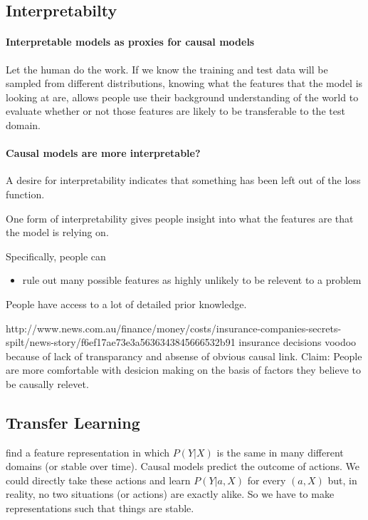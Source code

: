 \documentclass[11pt,a4paper,oneside]{book}
\begin{document}
\subsection*{Interpretabilty}
\paragraph*{Interpretable models as proxies for causal models} Let the human do the work. If we know the training and test data will be sampled from different distributions, knowing what the features that the model is looking at are, allows people use their background understanding of the world to evaluate whether or not those features are likely to be transferable to the test domain. 

\paragraph*{Causal models are more interpretable?}

A desire for interpretability indicates that something has been left out of the loss function. 

One form of interpretability gives people insight into what the features are that the model is relying on.

Specifically, people can
\begin{itemize}
\item rule out many possible features as highly unlikely to be relevent to a problem
\end{itemize}

People have access to a lot of detailed prior knowledge.  

http://www.news.com.au/finance/money/costs/insurance-companies-secrets-spilt/news-story/f6ef17ae73e3a5636343845666532b91 insurance decisions voodoo because of lack of transparancy and absense of obvious causal link. Claim: People are more comfortable with desicion making on the basis of factors they believe to be causally relevet.

\subsection*{Transfer Learning}
find a feature representation in which $P(Y|X)$ is the same in many different domains (or stable over time). Causal models predict the outcome of actions. We could directly take these actions and learn $P(Y|a,X)$ for every $(a,X)$ but, in reality, no two situations (or actions) are exactly alike. So we have to make representations such that things are stable. 
\end{document}
